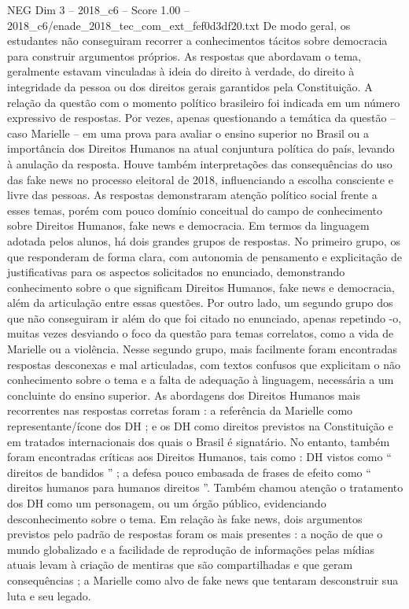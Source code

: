 \begin{textsample}{NEG Dim 3 – 2018\_c6 – Score 1.00 – 2018\_c6/enade\_2018\_tec\_com\_ext\_fef0d3df20.txt}
De modo geral, os estudantes não conseguiram recorrer a conhecimentos tácitos sobre democracia para construir argumentos próprios.
As respostas que abordavam o tema, geralmente estavam vinculadas à ideia do direito à verdade, do direito à integridade da pessoa ou dos direitos gerais garantidos pela Constituição.
A relação da questão com o momento político brasileiro foi indicada em um número expressivo de respostas.
Por vezes, apenas questionando a temática da questão – caso Marielle – em uma prova para avaliar o ensino superior no Brasil ou a importância dos Direitos Humanos na atual conjuntura política do país, levando à anulação da resposta.
Houve também interpretações das consequências do uso das fake news no processo eleitoral de 2018, influenciando a escolha consciente e livre das pessoas.
As respostas demonstraram atenção político social frente a esses temas, porém com pouco domínio conceitual do campo de conhecimento sobre Direitos Humanos, fake news e democracia.
Em termos da linguagem adotada pelos alunos, há dois grandes grupos de respostas.
No primeiro grupo, os que responderam de forma clara, com autonomia de pensamento e explicitação de justificativas para os aspectos solicitados no enunciado, demonstrando conhecimento sobre o que significam Direitos Humanos, fake news e democracia, além da articulação entre essas questões.
Por outro lado, um segundo grupo dos que não conseguiram ir além do que foi citado no enunciado, apenas repetindo -o, muitas vezes desviando o foco da questão para temas correlatos, como a vida de Marielle ou a violência.
Nesse segundo grupo, mais facilmente foram encontradas respostas desconexas e mal articuladas, com textos confusos que explicitam o não conhecimento sobre o tema e a falta de adequação à linguagem, necessária a um concluinte do ensino superior.
As abordagens dos Direitos Humanos mais recorrentes nas respostas corretas foram : a referência da Marielle como representante/ícone dos DH ; e os DH como direitos previstos na Constituição e em tratados internacionais dos quais o Brasil é signatário.
No entanto, também foram encontradas críticas aos Direitos Humanos, tais como : DH vistos como “ direitos de bandidos ” ; a defesa pouco embasada de frases de efeito como “ direitos humanos para humanos direitos ”.
Também chamou atenção o tratamento dos DH como um personagem, ou um órgão público, evidenciando desconhecimento sobre o tema.
Em relação às fake news, dois argumentos previstos pelo padrão de respostas foram os mais presentes : a noção de que o mundo globalizado e a facilidade de reprodução de informações pelas mídias atuais levam à criação de mentiras que são compartilhadas e que geram consequências ; a Marielle como alvo de fake news que tentaram desconstruir sua luta e seu legado.

\end{textsample}
